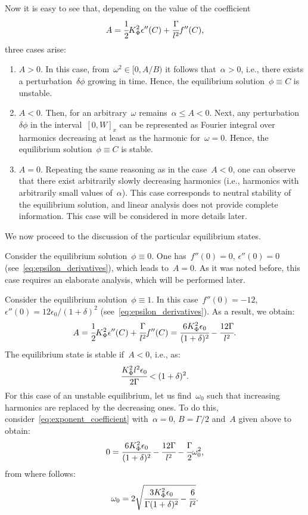 Now it is easy to see that, depending on the value of the coefficient
$$A = \cfrac{1}{2} K_\Phi^2 \epsilon''(C) + \cfrac{\Gamma}{l^2} f''(C) {\text{,}}$$
three cases arise:
%
\begin{enumerate}[label=\arabic*.]
\item $A > 0$. In this case, from~$\omega^2 \in [0, A / B)$ it follows
  that~$\alpha > 0$, i.e., there exists a perturbation~$\delta \phi$
  growing in time. Hence, the equilibrium solution~$\phi \equiv C$ is
  unstable.
  
\item $A < 0$. Then, for an arbitrary~$\omega$ remains~$\alpha
  \leqslant A < 0$. Next, any perturbation~$\delta \phi$ in the
  interval~$[0, W]_x$ 
  can be represented as Fourier integral over harmonics decreasing
  at least as the harmonic for~$\omega = 0$.
  Hence, the equilibrium solution~$\phi \equiv C$ is stable.
  
\item $A = 0$. Repeating the same reasoning as in the case~$A < 0$,
  one can observe that there exist arbitrarily slowly decreasing
  harmonics (i.e., harmonics with arbitrarily small values of~$\alpha$).
  This case corresponds to neutral stability of the equilibrium
  solution, and linear analysis does not provide complete
  information.
  This case will be considered in more details later.
\end{enumerate}

We now proceed to the discussion of the particular equilibrium states.

Consider the equilibrium solution~$\phi \equiv 0$.
One has~$f''(0) = 0$, $\epsilon''(0) = 0$
(see~\eqref{eq:epsilon_derivatives}),
which leads to~$A = 0$.
As it was noted before, this case requires an elaborate analysis, which will be
performed later.

Consider the equilibrium solution~$\phi \equiv 1$.
In this case~$f''(0) = -12$, $\epsilon''(0) = 12 \epsilon_0 / (1 +
\delta)^2$ (see~\eqref{eq:epsilon_derivatives}).
As a result, we obtain:
$$A = \cfrac{1}{2} K_\Phi^2 \epsilon''(C) + \cfrac{\Gamma}{l^2} f''(C) = \cfrac{6 K_\Phi^2 \epsilon_0}{(1 + \delta)^2} - \cfrac{12 \Gamma}{l^2} {\text{.}}$$
The equilibrium state is stable if~$A < 0$, i.e., as:
\begin{equation}
  \cfrac{K_\Phi^2 l^2 \epsilon_0}{2 \Gamma} < (1 + \delta)^2 {\text{.}}
  \label{cond:equilibrium_1_stable}
\end{equation}      
For this case of an unstable equilibrium, let us find~$\omega_0$ such that
increasing harmonics are replaced by the decreasing ones.
To do this, consider~\eqref{eq:exponent_coefficient} with~$\alpha =
0$, $B = \Gamma/2$ and~$A$ given above to obtain: 
$$0 = \cfrac{6 K_\Phi^2 \epsilon_0}{(1 + \delta)^2} - \cfrac{12 \Gamma}{l^2} - \cfrac{\Gamma}{2} \omega_0^2 {\text{,}}$$
from where follows:
$$\omega_0 = 2 \sqrt{\cfrac{3 K_\Phi^2 \epsilon_0}{\Gamma (1 + \delta)^2} - \cfrac{6}{l^2}} {\text{.}}$$

